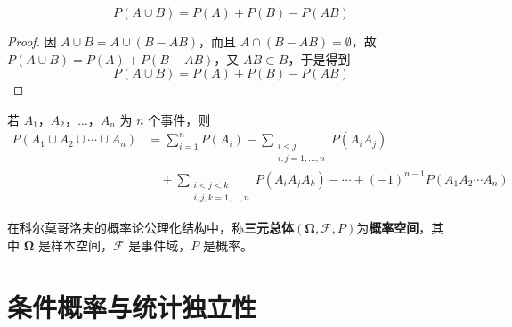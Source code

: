 \begin{proposition}[加法公式]\label{prop:加法公式}
\begin{equation}
    P(A \cup B) = P(A) + P(B) - P(AB)\label{eq:union_prob}
\end{equation}
\end{proposition}
\begin{proof}
    因 $A \cup B = A \cup (B - AB)$，而且 $A \cap (B - AB) = \emptyset$，故 $P(A \cup B) = P(A) + P(B - AB)$，又 $AB \subset B$，于是得到
\[
P(A \cup B) = P(A) + P(B) - P(AB)
\]
\end{proof}
\begin{proposition}[一般加法公式]\label{prop:一般加法公式}
    若 $A_1，A_2，\ldots，A_n$ 为 $n$ 个事件，则
\begin{equation} \label{eq:general_addition_formula}
\begin{aligned}
P(A_1 \cup A_2 \cup \cdots \cup A_n) &= \sum_{i=1}^n P(A_i) - \sum_{\substack{i<j \\ i,j=1,\ldots,n}} P(A_i A_j) \\
&\quad + \sum_{\substack{i<j<k \\ i,j,k=1,\ldots,n}} P(A_i A_j A_k) - \cdots + (-1)^{n-1}P(A_1 A_2 \cdots A_n)
\end{aligned}
\end{equation}
\end{proposition}

\begin{definition}[概率空间]\label{def:概率空间}
    在科尔莫哥洛夫的概率论公理化结构中，称\textbf{三元总体}$(\boldsymbol{\Omega},\mathcal{F},P)$为\textbf{概率空间}，其中 $\boldsymbol{\Omega}$ 是样本空间，$\mathcal{F}$ 是事件域，$P$ 是概率。
\end{definition}

\section{条件概率与统计独立性}\label{sec:条件概率与统计独立性}
